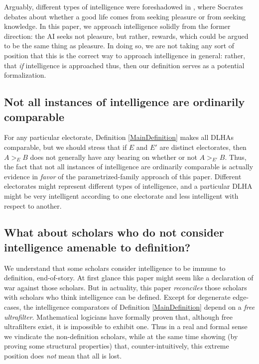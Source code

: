 \documentclass[twoside,11pt]{article}
\begin{document}
Arguably, different types of intelligence were foreshadowed in
\citet{philebus}, where Socrates debates about whether a good life comes
from seeking pleasure or from seeking knowledge. In this paper, we approach
intelligence solidly from the former direction: the AI seeks not pleasure, but
rather, rewards, which could be argued to be the same thing as pleasure.
In doing so, we are not taking any sort of position that this is the correct
way to approach intelligence in general: rather, that \emph{if} intelligence is
approached thus, then our definition serves as a potential formalization.

\subsection{Not all instances of intelligence are ordinarily comparable}

For any particular electorate, Definition \ref{MainDefinition} makes all
DLHAs comparable, but we should stress that if $E$ and $E'$ are distinct
electorates, then $A>_EB$ does not generally have any bearing on whether
or not $A>_{E'}B$. Thus, the fact that not all instances of intelligence
are ordinarily comparable is actually evidence in \emph{favor} of the
parametrized-family approach of this paper. Different electorates might
represent different types of intelligence, and a particular DLHA might
be very intelligent according to one electorate and less intelligent
with respect to another.

\subsection{What about scholars who do not consider intelligence amenable to definition?}

We understand that some scholars consider intelligence to be immune to
definition, end-of-story. At first glance this paper
might seem like a declaration of war against those
scholars. But in actuality, this paper \emph{reconciles} those
scholars with scholars who think intelligence can be defined.
Except for degenerate edge-cases, the intelligence comparators of
Definition \ref{MainDefinition} depend on a \emph{free ultrafilter}.
Mathematical logicians have formally proven that, although free ultrafilters
exist, it is impossible to exhibit one. Thus in a real and
formal sense we vindicate the non-definition scholars, while at the same
time showing (by proving some structural properties) that, counter-intuitively,
this extreme position does \emph{not} mean that all is lost.
\end{document}
